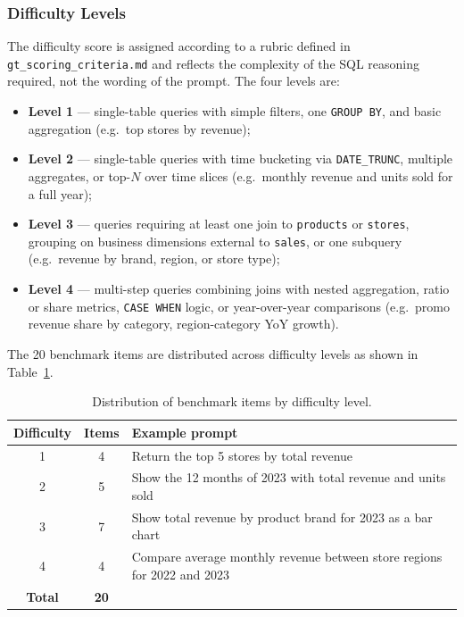 \documentclass[11pt,a4paper]{article}
\begin{document}
\subsubsection{Difficulty Levels}

The difficulty score is assigned according to a rubric defined in
\texttt{gt\_scoring\_criteria.md} and reflects the complexity of the SQL reasoning
required, not the wording of the prompt. The four levels are:

\begin{itemize}
    \item \textbf{Level 1} — single-table queries with simple filters, one
          \texttt{GROUP BY}, and basic aggregation (e.g.\ top stores by revenue);
    \item \textbf{Level 2} — single-table queries with time bucketing via
          \texttt{DATE\_TRUNC}, multiple aggregates, or top-$N$ over time slices
          (e.g.\ monthly revenue and units sold for a full year);
    \item \textbf{Level 3} — queries requiring at least one join to \texttt{products}
          or \texttt{stores}, grouping on business dimensions external to
          \texttt{sales}, or one subquery (e.g.\ revenue by brand, region, or store type);
    \item \textbf{Level 4} — multi-step queries combining joins with nested
          aggregation, ratio or share metrics, \texttt{CASE WHEN} logic, or
          year-over-year comparisons (e.g.\ promo revenue share by category,
          region-category YoY growth).
\end{itemize}

The 20 benchmark items are distributed across difficulty levels as shown in
Table~\ref{tab:benchmark_dist}.

\begin{table}[h]
\centering
\begin{tabular}{|c|c|p{7cm}|}
\hline
\rowcolor{bluePoli!30}
\textbf{Difficulty} & \textbf{Items} & \textbf{Example prompt} \T\B \\
\hline
1 & 4 & Return the top 5 stores by total revenue \T\B \\
2 & 5 & Show the 12 months of 2023 with total revenue and units sold \T\B \\
3 & 7 & Show total revenue by product brand for 2023 as a bar chart \T\B \\
4 & 4 & Compare average monthly revenue between store regions for 2022 and 2023 \T\B \\
\hline
\textbf{Total} & \textbf{20} & \T\B \\
\hline
\end{tabular}
\caption{Distribution of benchmark items by difficulty level.}
\label{tab:benchmark_dist}
\end{table}
\end{document}
